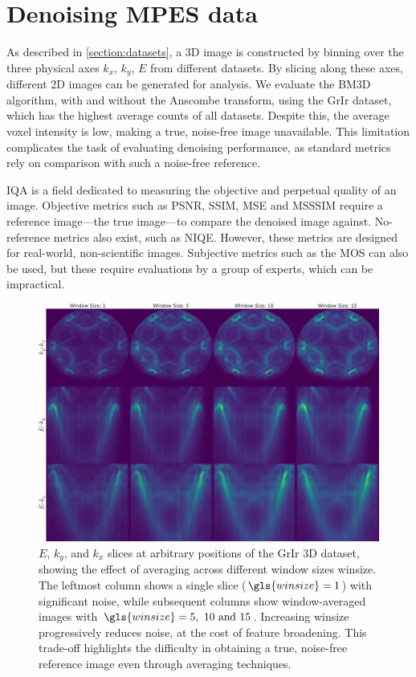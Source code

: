 \section{Denoising MPES data}
As described in \cref{section:datasets}, a 3D image is constructed by binning over the three physical axes $k_x$, $k_y$, $E$ from different datasets. By slicing along these axes, different 2D images can be generated for analysis. We evaluate the \gls{BM3D} algorithm, with and without the Anscombe transform, using the \gls{GrIr} dataset, which has the highest average counts of all datasets. Despite this, the average voxel intensity is low, making a true, noise-free image unavailable. This limitation complicates the task of evaluating denoising performance, as standard metrics rely on comparison with such a noise-free reference.

\Gls{IQA} is a field dedicated to measuring the objective and perpetual quality of an image. Objective metrics such as \gls{PSNR}, \gls{SSIM}, \gls{MSE} and \gls{MSSSIM} require a reference image---the true image---to compare the denoised image against. No-reference metrics also exist, such as \gls{NIQE}. However, these metrics are designed for real-world, non-scientific images. Subjective metrics such as the \gls{MOS} can also be used, but these require evaluations by a group of experts, which can be impractical.

\begin{figure}
    \centering
    \includegraphics[width=1\linewidth]{images/slices.pdf}
    \caption{$E$, $k_y$, and $k_x$ slices at arbitrary positions of the \gls{GrIr} 3D dataset, showing the effect of averaging across different window sizes \gls{winsize}. The leftmost column shows a single slice ($\gls{winsize}=1$) with significant noise, while subsequent columns show window-averaged images with $\gls{winsize}=\numlist{5;10;15}$. Increasing \gls{winsize} progressively reduces noise, at the cost of feature broadening. This trade-off highlights the difficulty in obtaining a true, noise-free reference image even through averaging techniques.}
    \label{fig:slices}
\end{figure}

